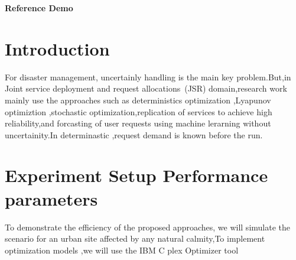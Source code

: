 \documentclass{article}
\begin{document}
\begin{center}
\Large{\textbf{Reference Demo}}
\end{center}
\section{Introduction}
For disaster management, uncertainly handling is the main key problem.But,in
Joint service deployment and request allocations~(JSR) domain,research work
mainly use the approaches such as deterministics optimization
\cite{dilruba2016platinum},Lyapunov optimiztion
\cite{sealy2008problem},stochastic optimization,replication of services to achieve high
reliability,and forcasting of user requests using machine lerarning without
uncertainity.In determinastic \cite{giaccone2000clinical},request demand is known before the
run.
\section{Experiment Setup Performance parameters}
To demonstrate the efficiency of the proposed approaches, we will simulate the
scenario for an urban site affected by any natural calmity\cite{dilruba2016platinum},To
implement optimization models ,we will use the IBM C plex Optimizer
tool\cite{ray2017internet}


\end{document}
